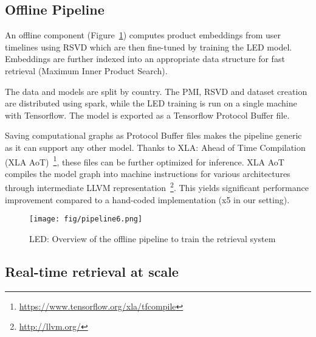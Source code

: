 \documentclass[sigconf]{acmart}
\begin{document}
\subsection{Offline Pipeline}
\label{subsec:offline-pipline}

An offline component (Figure~\ref{fig:reference-system}) computes product embeddings from user timelines using RSVD which are then fine-tuned by training the LED model. Embeddings are further indexed into an appropriate data structure for fast retrieval (Maximum Inner Product Search). 

The data and models are split by country. The PMI, RSVD and dataset creation are distributed using spark, while the LED training is run on a single machine with Tensorflow. The model is exported as a Tensorflow Protocol Buffer file.



Saving computational graphs as Protocol Buffer files makes the pipeline generic as it can support any other model. Thanks to XLA: Ahead of Time Compilation (XLA AoT)~\footnote{\url{https://www.tensorflow.org/xla/tfcompile}}, these files can be further optimized for inference. XLA AoT compiles the model graph into machine instructions for various architectures through intermediate LLVM representation~\footnote{\url{http://llvm.org/}}. This yields significant performance improvement compared to a hand-coded implementation (x5 in our setting). 
















\begin{figure}[h!]
\centering
\texttt{[image: fig/pipeline6.png]}
\caption{LED: Overview of the offline pipeline to train the retrieval system}
\label{fig:reference-system}
\end{figure}

\subsection{Real-time retrieval at scale}
\label{subsec:online-knn}
\end{document}
